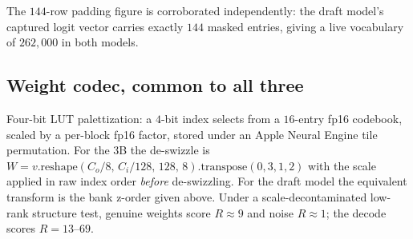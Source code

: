 The $144$-row padding figure is corroborated independently: the draft model's captured logit vector
carries exactly $144$ masked entries, giving a live vocabulary of $262{,}000$ in both models.

\subsection{Weight codec, common to all three}

Four-bit LUT palettization: a $4$-bit index selects from a $16$-entry \textrm{fp16} codebook, scaled by
a per-block \textrm{fp16} factor, stored under an Apple Neural Engine tile permutation. For the $3$B the
de-swizzle is $W = v.\mathrm{reshape}(C_o/8,\,C_i/128,\,128,\,8).\mathrm{transpose}(0,3,1,2)$ with the
scale applied in raw index order \emph{before} de-swizzling. For the draft model the equivalent
transform is the bank z-order given above. Under a scale-decontaminated low-rank structure test,
genuine weights score $R \approx 9$ and noise $R \approx 1$; the decode scores $R = 13$--$69$.
